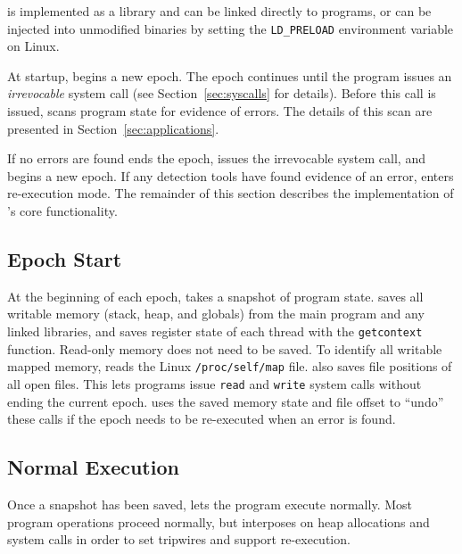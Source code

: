 \label{sec:implementation}

\doubletake{} is implemented as a library and can be linked directly to programs, or can be injected into unmodified binaries by setting the \texttt{LD\_PRELOAD} environment variable on Linux.

At startup, \doubletake{} begins a new epoch. The epoch continues until the program issues an \emph{irrevocable} system call (see Section~\ref{sec:syscalls} for details). Before this call is issued, \doubletake{} scans program state for evidence of errors. The details of this scan are presented in Section~\ref{sec:applications}.

If no errors are found \doubletake{} ends the epoch, issues the irrevocable system call, and begins a new epoch. If any detection tools have found evidence of an error, \doubletake{} enters re-execution mode. The remainder of this section describes the implementation of \doubletake{}'s core functionality.

\subsection{Epoch Start}
\label{sec:implementation/start}

At the beginning of each epoch, \doubletake{} takes a snapshot of program state. \doubletake{} saves all writable memory (stack, heap, and globals) from the main program and any linked libraries, and saves register state of each thread with the \texttt{getcontext} function. Read-only memory does not need to be saved. To identify all writable mapped memory, \doubletake{} reads the Linux \texttt{/proc/self/map} file. \doubletake{} also saves file positions of all open files. This lets programs issue \texttt{read} and \texttt{write} system calls without ending the current epoch. \doubletake{} uses the saved memory state and file offset to ``undo'' these calls if the epoch needs to be re-executed when an error is found.


\subsection{Normal Execution}
\label{sec:implementation/normalexecution}

Once a snapshot has been saved, \doubletake{} lets the program execute normally. Most program operations proceed normally, but \doubletake{} interposes on heap allocations and system calls in order to set tripwires and support re-execution.

